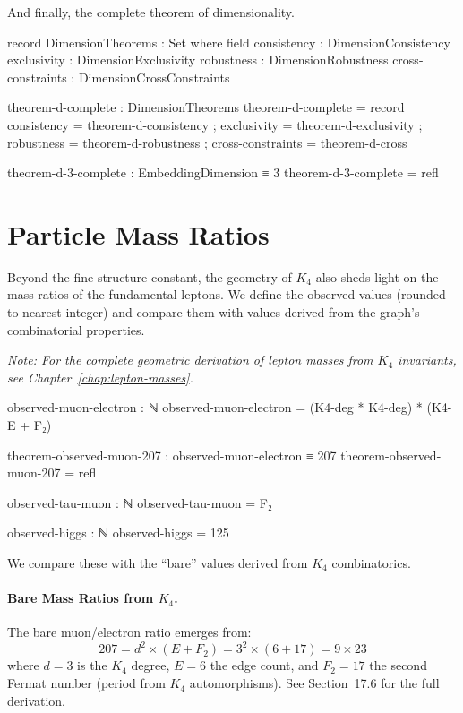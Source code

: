 \documentclass[11pt,a4paper]{book}
\begin{document}
And finally, the complete theorem of dimensionality.

\begin{code}
record DimensionTheorems : Set where
  field
    consistency       : DimensionConsistency
    exclusivity       : DimensionExclusivity
    robustness        : DimensionRobustness
    cross-constraints : DimensionCrossConstraints

theorem-d-complete : DimensionTheorems
theorem-d-complete = record
  { consistency       = theorem-d-consistency
  ; exclusivity       = theorem-d-exclusivity
  ; robustness        = theorem-d-robustness
  ; cross-constraints = theorem-d-cross
  }

theorem-d-3-complete : EmbeddingDimension ≡ 3
theorem-d-3-complete = refl
\end{code}

\section{Particle Mass Ratios}
\label{sec:mass-ratios-intro}

Beyond the fine structure constant, the geometry of $K_4$ also sheds light on the mass ratios of the fundamental leptons. We define the observed values (rounded to nearest integer) and compare them with values derived from the graph's combinatorial properties.

\medskip
\noindent\textit{Note: For the complete geometric derivation of lepton masses from $K_4$ invariants, see Chapter~\ref{chap:lepton-masses}.}

\begin{code}
observed-muon-electron : ℕ
observed-muon-electron = (K4-deg * K4-deg) * (K4-E + F₂)

theorem-observed-muon-207 : observed-muon-electron ≡ 207
theorem-observed-muon-207 = refl

observed-tau-muon : ℕ
observed-tau-muon = F₂

observed-higgs : ℕ
observed-higgs = 125

\end{code}

We compare these with the ``bare'' values derived from $K_4$ combinatorics.

\paragraph{Bare Mass Ratios from $K_4$.}
The bare muon/electron ratio emerges from:
\[
207 = d^2 \times (E + F_2) = 3^2 \times (6 + 17) = 9 \times 23
\]
where $d = 3$ is the $K_4$ degree, $E = 6$ the edge count, and $F_2 = 17$ the second Fermat number (period from $K_4$ automorphisms). See Section~17.6 for the full derivation.
\end{document}
